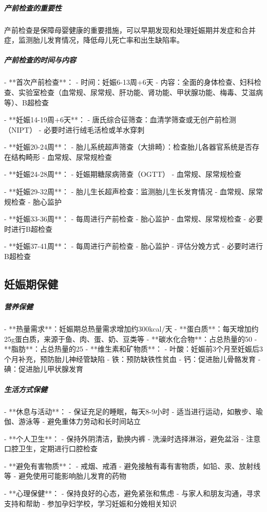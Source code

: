\begin{enumerate}
\subparagraph{产前检查的重要性}

产前检查是保障母婴健康的重要措施，可以早期发现和处理妊娠期并发症和合并症，监测胎儿发育情况，降低母儿死亡率和出生缺陷率。

\subparagraph{产前检查的时间与内容}

- **首次产前检查**：
  - 时间：妊娠6-13周+6天
  - 内容：全面的身体检查、妇科检查、实验室检查（血常规、尿常规、肝功能、肾功能、甲状腺功能、梅毒、艾滋病等）、B超检查

- **妊娠14-19周+6天**：
  - 唐氏综合征筛查：血清学筛查或无创产前检测（NIPT）
  - 必要时进行绒毛活检或羊水穿刺

- **妊娠20-24周**：
  - 胎儿系统超声筛查（大排畸）：检查胎儿各器官系统是否存在结构畸形
  - 血常规、尿常规检查

- **妊娠24-28周**：
  - 妊娠期糖尿病筛查（OGTT）
  - 血常规、尿常规检查

- **妊娠29-32周**：
  - 胎儿生长超声检查：监测胎儿生长发育情况
  - 血常规、尿常规检查
  - 胎心监护

- **妊娠33-36周**：
  - 每周进行产前检查
  - 胎心监护
  - 血常规、尿常规检查
  - 必要时进行B超检查

- **妊娠37-41周**：
  - 每周进行产前检查
  - 胎心监护
  - 评估分娩方式
  - 必要时进行B超检查

\subsection{妊娠期保健}

\subparagraph{营养保健}

- **热量需求**：妊娠期总热量需求增加约300kcal/天
- **蛋白质**：每天增加约25g蛋白质，来源于鱼、肉、蛋、奶、豆类等
- **碳水化合物**：占总热量的50%
- **脂肪**：占总热量的25%
- **维生素和矿物质**：
  - 叶酸：妊娠前3个月至妊娠后3个月补充，预防胎儿神经管缺陷
  - 铁：预防缺铁性贫血
  - 钙：促进胎儿骨骼发育
  - 碘：促进胎儿甲状腺发育

\subparagraph{生活方式保健}

- **休息与活动**：
  - 保证充足的睡眠，每天8-9小时
  - 适当进行运动，如散步、瑜伽、游泳等
  - 避免重体力劳动和长时间站立

- **个人卫生**：
  - 保持外阴清洁，勤换内裤
  - 洗澡时选择淋浴，避免盆浴
  - 注意口腔卫生，定期进行口腔检查

- **避免有害物质**：
  - 戒烟、戒酒
  - 避免接触有毒有害物质，如铅、汞、放射线等
  - 避免使用可能影响胎儿发育的药物

- **心理保健**：
  - 保持良好的心态，避免紧张和焦虑
  - 与家人和朋友沟通，寻求支持和帮助
  - 参加孕妇学校，学习妊娠和分娩相关知识


\end{enumerate}
